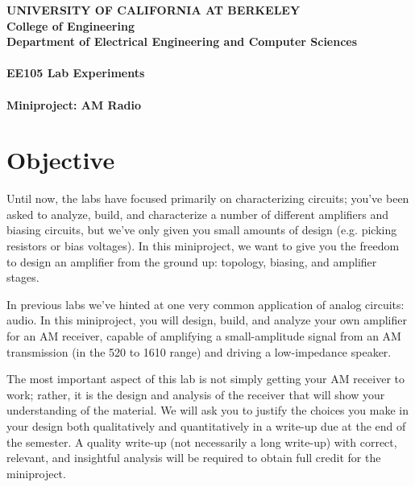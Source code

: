 \documentclass{article}
\begin{document}
\thispagestyle{plain}

\begin{center}
  \textbf{
    UNIVERSITY OF CALIFORNIA AT BERKELEY \\
    College of Engineering \\
    Department of Electrical Engineering and Computer Sciences \\~\\
    \large{EE105 Lab Experiments} \\\LARGE{~}\\
    \LARGE{Miniproject: AM Radio}
  }
\end{center}

\section{Objective}
Until now, the labs have focused primarily on characterizing circuits; you've been asked to analyze, build, and characterize a number of different amplifiers and biasing circuits, but we've only given you small amounts of design (e.g. picking resistors or bias voltages). In this miniproject, we want to give you the freedom to design an amplifier from the ground up: topology, biasing, and amplifier stages.

In previous labs we've hinted at one very common application of analog circuits: audio. In this miniproject, you will design, build, and analyze your own amplifier for an AM receiver, capable of amplifying a small-amplitude signal from an AM transmission (in the \unit{520}{\kilo\hertz} to \unit{1610}{\kilo\hertz} range) and driving a low-impedance speaker.

The most important aspect of this lab is not simply getting your AM receiver to work; rather, it is the design and analysis of the receiver that will show your understanding of the material. We will ask you to justify the choices you make in your design both qualitatively and quantitatively in a write-up due at the end of the semester. A quality write-up (not necessarily a long write-up) with correct, relevant, and insightful analysis will be required to obtain full credit for the miniproject.
\end{document}
